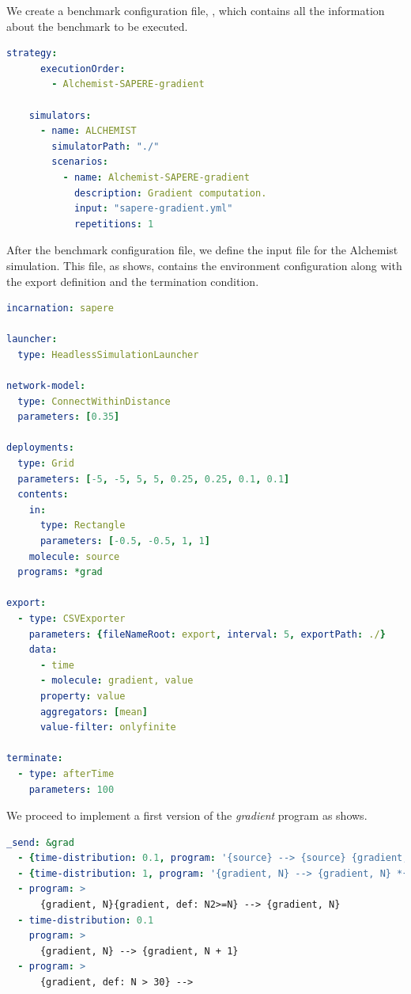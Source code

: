 \documentclass[12pt,a4paper,openright,twoside]{book}
\begin{document}
We create a benchmark configuration file, , which contains all the information about the benchmark to be executed.

\begin{lstlisting}[language=yaml, label={lst:cosBenchmarkConfig}, caption={Case of study: benchmark configuration file.}]
    strategy:
      executionOrder:
        - Alchemist-SAPERE-gradient
    
    simulators:
      - name: ALCHEMIST
        simulatorPath: "./"
        scenarios:
          - name: Alchemist-SAPERE-gradient
            description: Gradient computation.
            input: "sapere-gradient.yml"
            repetitions: 1
\end{lstlisting}

After the benchmark configuration file, we define the input file for the Alchemist simulation.
This file, as  shows, contains the environment configuration along with the export definition and the termination condition.

\begin{lstlisting}[language=yaml, label={lst:cos-alchem-conf}, caption={Case of study: Alchemist input file.}]
incarnation: sapere

launcher:
  type: HeadlessSimulationLauncher

network-model:
  type: ConnectWithinDistance
  parameters: [0.35]

deployments:
  type: Grid
  parameters: [-5, -5, 5, 5, 0.25, 0.25, 0.1, 0.1]
  contents:
    in:
      type: Rectangle
      parameters: [-0.5, -0.5, 1, 1]
    molecule: source
  programs: *grad
  
export:
  - type: CSVExporter
    parameters: {fileNameRoot: export, interval: 5, exportPath: ./}
    data: 
      - time
      - molecule: gradient, value
      property: value
      aggregators: [mean]
      value-filter: onlyfinite

terminate:
  - type: afterTime
    parameters: 100
\end{lstlisting}

We proceed to implement a first version of the \emph{gradient} program as  shows.

\begin{lstlisting}[language=yaml, label={lst:cos-alchem-solA}, caption={Case of study: gradient program A.}]
_send: &grad
  - {time-distribution: 0.1, program: '{source} --> {source} {gradient, 0}'}
  - {time-distribution: 1, program: '{gradient, N} --> {gradient, N} *{gradient, N+#D}'}
  - program: >
      {gradient, N}{gradient, def: N2>=N} --> {gradient, N}
  - time-distribution: 0.1
    program: >
      {gradient, N} --> {gradient, N + 1}
  - program: >
      {gradient, def: N > 30} -->
    \end{lstlisting}
\end{document}
